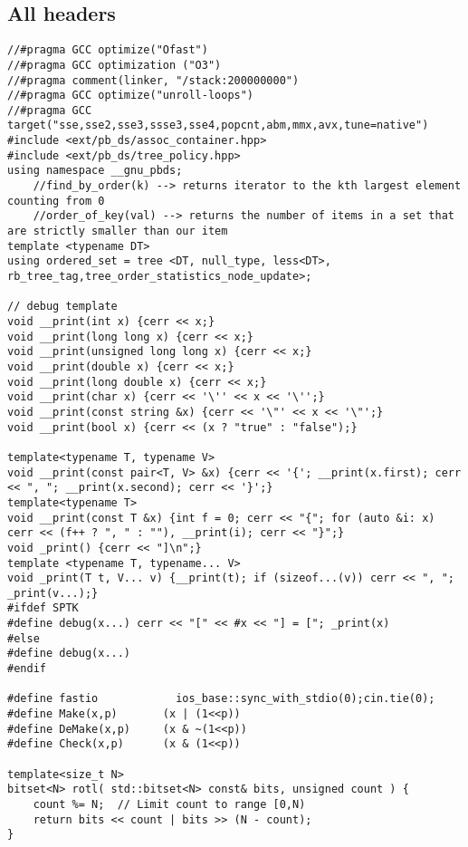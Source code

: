 \documentclass[FSZ,a4paper,onesided]{article}
\begin{document}
\begin{multicols*}{\COLS}
\tableofcontents
\newpage
{}


\section{All headers}
\begin{lstlisting}
//#pragma GCC optimize("Ofast")
//#pragma GCC optimization ("O3")
//#pragma comment(linker, "/stack:200000000")
//#pragma GCC optimize("unroll-loops")
//#pragma GCC target("sse,sse2,sse3,ssse3,sse4,popcnt,abm,mmx,avx,tune=native")
#include <ext/pb_ds/assoc_container.hpp>
#include <ext/pb_ds/tree_policy.hpp>
using namespace __gnu_pbds;
    //find_by_order(k) --> returns iterator to the kth largest element counting from 0
    //order_of_key(val) --> returns the number of items in a set that are strictly smaller than our item
template <typename DT> 
using ordered_set = tree <DT, null_type, less<DT>, rb_tree_tag,tree_order_statistics_node_update>;

// debug template
void __print(int x) {cerr << x;}
void __print(long long x) {cerr << x;}
void __print(unsigned long long x) {cerr << x;}
void __print(double x) {cerr << x;}
void __print(long double x) {cerr << x;}
void __print(char x) {cerr << '\'' << x << '\'';}
void __print(const string &x) {cerr << '\"' << x << '\"';}
void __print(bool x) {cerr << (x ? "true" : "false");}

template<typename T, typename V>
void __print(const pair<T, V> &x) {cerr << '{'; __print(x.first); cerr << ", "; __print(x.second); cerr << '}';}
template<typename T>
void __print(const T &x) {int f = 0; cerr << "{"; for (auto &i: x) cerr << (f++ ? ", " : ""), __print(i); cerr << "}";}
void _print() {cerr << "]\n";}
template <typename T, typename... V>
void _print(T t, V... v) {__print(t); if (sizeof...(v)) cerr << ", "; _print(v...);}
#ifdef SPTK
#define debug(x...) cerr << "[" << #x << "] = ["; _print(x)
#else
#define debug(x...)
#endif

#define fastio            ios_base::sync_with_stdio(0);cin.tie(0);
#define Make(x,p)       (x | (1<<p))
#define DeMake(x,p)     (x & ~(1<<p))
#define Check(x,p)      (x & (1<<p))

template<size_t N>
bitset<N> rotl( std::bitset<N> const& bits, unsigned count ) {
    count %= N;  // Limit count to range [0,N)
    return bits << count | bits >> (N - count);
}\end{lstlisting}

\end{multicols*}
\end{document}
